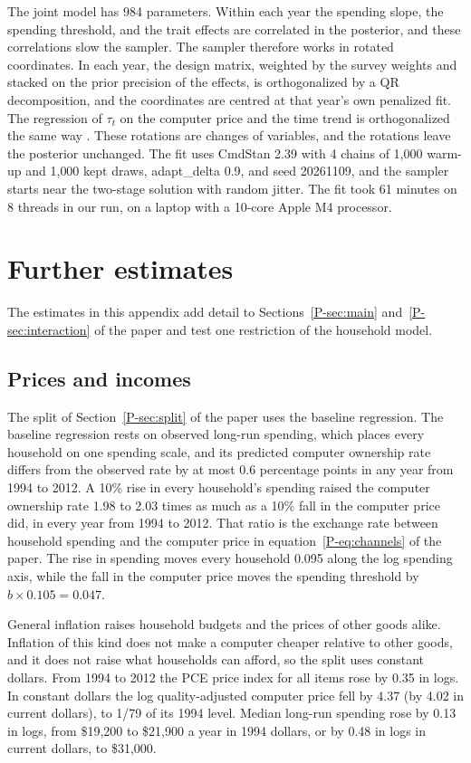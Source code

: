 \documentclass[11pt]{article}
\begin{document}
The joint model has 984 parameters. Within each year the spending slope, the spending threshold, and the trait effects are correlated in the posterior, and these correlations slow the sampler. The sampler therefore works in rotated coordinates. In each year, the design matrix, weighted by the survey weights and stacked on the prior precision of the effects, is orthogonalized by a QR decomposition, and the coordinates are centred at that year's own penalized fit. The regression of $\tau_t$ on the computer price and the time trend is orthogonalized the same way \citep{stan2026}. These rotations are changes of variables, and the rotations leave the posterior unchanged. The fit uses CmdStan 2.39 with 4 chains of 1{,}000 warm-up and 1{,}000 kept draws, adapt\_delta 0.9, and seed 20261109, and the sampler starts near the two-stage solution with random jitter. The fit took 61 minutes on 8 threads in our run, on a laptop with a 10-core Apple M4 processor.


\section{Further estimates}
\label{app:detail}

The estimates in this appendix add detail to Sections~\ref{P-sec:main} and~\ref{P-sec:interaction} of the paper and test one restriction of the household model.

\subsection{Prices and incomes}
\label{app:pricesincomes}

The split of Section~\ref{P-sec:split} of the paper uses the baseline regression. The baseline regression rests on observed long-run spending, which places every household on one spending scale, and its predicted computer ownership rate differs from the observed rate by at most 0.6 percentage points in any year from 1994 to 2012. A 10\% rise in every household's spending raised the computer ownership rate 1.98 to 2.03 times as much as a 10\% fall in the computer price did, in every year from 1994 to 2012. That ratio is the exchange rate between household spending and the computer price in equation~\eqref{P-eq:channels} of the paper. The rise in spending moves every household 0.095 along the log spending axis, while the fall in the computer price moves the spending threshold by $b \times 0.105 = 0.047$.

General inflation raises household budgets and the prices of other goods alike. Inflation of this kind does not make a computer cheaper relative to other goods, and it does not raise what households can afford, so the split uses constant dollars. From 1994 to 2012 the PCE price index for all items rose by 0.35 in logs. In constant dollars the log quality-adjusted computer price fell by 4.37 (by 4.02 in current dollars), to 1/79 of its 1994 level. Median long-run spending rose by 0.13 in logs, from \$19{,}200 to \$21{,}900 a year in 1994 dollars, or by 0.48 in logs in current dollars, to \$31{,}000.
\end{document}
